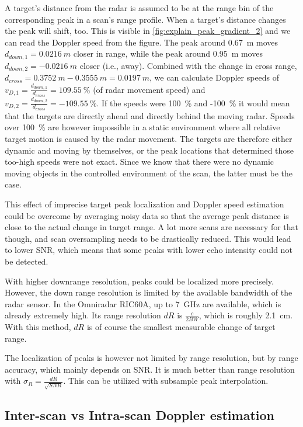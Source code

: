 A target's distance from the radar is assumed to be at the range bin of
the corresponding peak in a scan's range profile. When a target's
distance changes the peak will shift, too. This is visible in \cref{fig:explain_peak_gradient_2} and we can read the Doppler speed from the figure. The peak around \SI{0.67}{m} moves \(d_{down,1} = \SI{0.0216}{m}\) closer in range, while the peak
around \SI{0.95}{m} moves \(d_{down,2} = -\SI{0.0216}{m}\) closer (i.e., away).
Combined with the change in cross range,
\(d_{cross} = \SI{0.3752}{m} - \SI{0.3555}{m} = \SI{0.0197}{m}\), we can calculate Doppler
speeds of \(v_{D,1} = \frac{d_{down,1}}{d_{cross}} = \SI{109.55}{\%}\) (of
radar movement speed) and
\(v_{D,2} = \frac{d_{down,2}}{d_{cross}} = -\SI{109.55}{\%}\). If the speeds
were \SI{100}{\%} and -\SI{100}{\%} it would mean that the targets are directly
ahead and directly behind the moving radar. Speeds over \SI{100}{\%} are
however impossible in a static environment where all relative target
motion is caused by the radar movement. The targets are therefore either
dynamic and moving by themselves, or the peak locations that determined
those too-high speeds were not exact. Since we know that there were no
dynamic moving objects in the controlled environment of the scan, the
latter must be the case.

This effect of imprecise target peak localization and Doppler speed
estimation could be overcome by averaging noisy data so that the average
peak distance is close to the actual change in target range. A lot more
scans are necessary for that though, and scan oversampling needs to be
drastically reduced. This would lead to lower SNR, which means that some
peaks with lower echo intensity could not be detected.

With higher downrange resolution, peaks could be localized more
precisely. However, the down range resolution is limited by the
available bandwidth of the radar sensor. In the Omniradar RIC60A, up to
\SI{7}{GHz} are available, which is already extremely high. Its range
resolution \(dR\) is \(\frac{c}{2 BW}\), which is roughly \SI{2.1}{cm}. With
this method, \(dR\) is of course the smallest measurable change of
target range.

The localization of peaks is however not limited by range resolution,
but by range accuracy, which mainly depends on SNR. It is much better
than range resolution with \(\sigma_R = \frac{dR}{\sqrt{SNR}}\). This
can be utilized with subsample peak interpolation.

\subsection{Inter-scan vs Intra-scan Doppler estimation} \label{inter-scan-vs-intra-scan-doppler-estimation}

